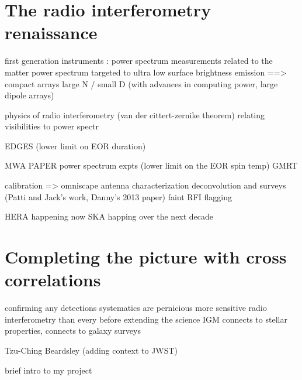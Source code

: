 \section{The radio interferometry renaissance}

first generation instruments : power spectrum measurements
related to the matter power spectrum
targeted to ultra low surface brightness emission ==> compact arrays
large N / small D (with advances in computing power, large dipole arrays)

physics of radio interferometry (van der cittert-zernike theorem)
relating visibilities to power spectr

EDGES (lower limit on EOR duration)

MWA
PAPER
	power spectrum expts (lower limit on the EOR spin temp)
GMRT

calibration => omniscape
antenna characterization
deconvolution and surveys (Patti and Jack's work, Danny's 2013 paper)
faint RFI flagging

HERA happening now
SKA happing over the next decade


\section{Completing the picture with cross correlations}

confirming any detections
	systematics are pernicious
	more sensitive radio interferometry than every before
extending the science
	IGM connects to stellar properties, connects to galaxy surveys

Tzu-Ching
Beardsley (adding context to JWST)

brief intro to my project

